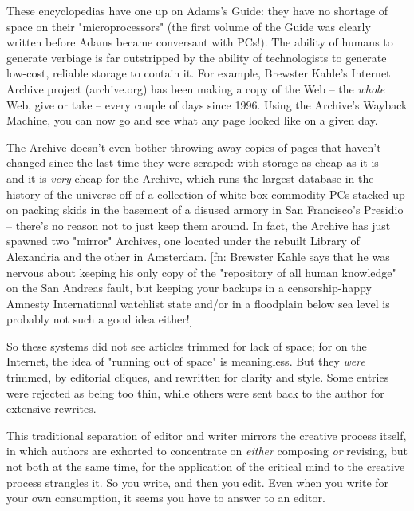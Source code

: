These encyclopedias have one up on Adams's Guide: they have no
shortage of space on their "microprocessors" (the first volume of
the Guide was clearly written before Adams became conversant with
PCs!). The ability of humans to generate verbiage is far
outstripped by the ability of technologists to generate low-cost,
reliable storage to contain it. For example, Brewster Kahle's
Internet Archive project (archive.org) has been making a copy of
the Web -- the \emph{whole} Web, give or take -- every couple of
days since 1996. Using the Archive's Wayback Machine, you can now
go and see what any page looked like on a given day.

The Archive doesn't even bother throwing away copies of pages that
haven't changed since the last time they were scraped: with storage
as cheap as it is -- and it is \emph{very} cheap for the Archive,
which runs the largest database in the history of the universe off
of a collection of white-box commodity PCs stacked up on packing
skids in the basement of a disused armory in San Francisco's
Presidio -- there's no reason not to just keep them around. In
fact, the Archive has just spawned two "mirror" Archives, one
located under the rebuilt Library of Alexandria and the other in
Amsterdam. [fn: Brewster Kahle says that he was nervous about
keeping his only copy of the "repository of all human knowledge" on
the San Andreas fault, but keeping your backups in a
censorship-happy Amnesty International watchlist state and/or in a
floodplain below sea level is probably not such a good idea
either!]

So these systems did not see articles trimmed for lack of space;
for on the Internet, the idea of "running out of space" is
meaningless. But they \emph{were} trimmed, by editorial cliques,
and rewritten for clarity and style. Some entries were rejected as
being too thin, while others were sent back to the author for
extensive rewrites.

This traditional separation of editor and writer mirrors the
creative process itself, in which authors are exhorted to
concentrate on \emph{either} composing \emph{or} revising, but
not both at the same time, for the application of the critical mind
to the creative process strangles it. So you write, and then you
edit. Even when you write for your own consumption, it seems you
have to answer to an editor.

